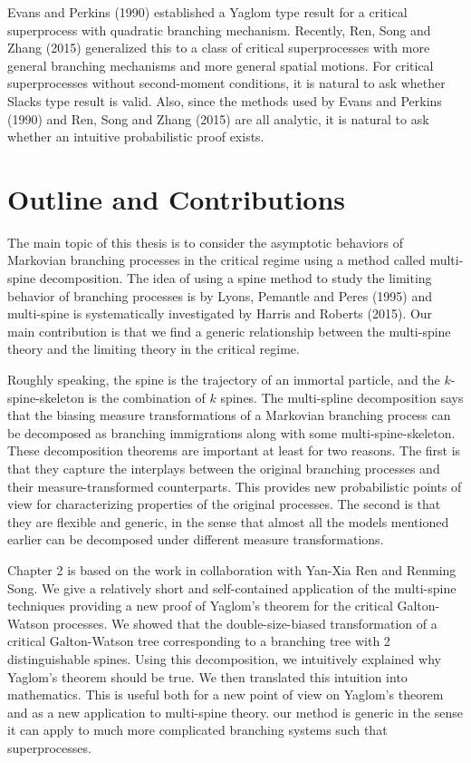     Evans and Perkins (1990) established a Yaglom type result for a critical superprocess with quadratic branching mechanism. Recently, Ren, Song and Zhang (2015) generalized this to a class of critical superprocesses with more general branching mechanisms and more general spatial motions. 
    For critical superprocesses without second-moment conditions, it is natural to ask whether Slacks type result is valid. Also, since the methods used by  Evans and Perkins (1990) and Ren, Song and Zhang (2015) are all analytic, it is natural to ask whether an intuitive probabilistic proof exists.

\section{Outline and Contributions}
    The main topic of this thesis is to consider the asymptotic behaviors of Markovian branching processes in the critical regime using a method called multi-spine decomposition. 
    The idea of using a spine method to study the limiting behavior of branching processes is by Lyons, Pemantle and Peres (1995) and multi-spine is systematically investigated by Harris and Roberts (2015). 
    Our main contribution is that we find a generic relationship between the multi-spine theory and the limiting theory in the critical regime.

    Roughly speaking, the spine is the trajectory of an immortal particle, and the $k$-spine-skeleton is the combination of $k$ spines.
    The multi-spline decomposition says that the biasing measure transformations of a Markovian branching process can be decomposed as branching immigrations along with some multi-spine-skeleton.
    These decomposition theorems are important at least for two reasons. 
    The first is that they capture the interplays between the original branching processes and their measure-transformed counterparts. 
    This provides new probabilistic points of view for characterizing properties of the original processes.
    The second is that they are flexible and generic, in the sense that almost all the models mentioned earlier can be decomposed under different measure transformations. 

    Chapter 2 is based on the work \cite{RenSongSun2018A-2-spine} in collaboration with Yan-Xia Ren and Renming Song.
    We give a relatively short and self-contained application of the multi-spine techniques providing a new proof of Yaglom’s theorem for the critical Galton-Watson processes. 
    We showed that the double-size-biased transformation of a critical Galton-Watson tree corresponding to a branching tree with 2 distinguishable spines. 
    Using this decomposition, we intuitively explained why Yaglom's theorem should be true. 
    We then translated this intuition into mathematics. This is useful both for a new point of view on Yaglom’s theorem and as a new application to multi-spine theory. our method is generic in the sense it can apply to much more complicated branching systems such that superprocesses. 

